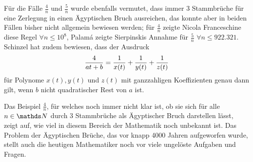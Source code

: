 Für die Fälle $\frac{4}{n}$ und $\frac{5}{n}$ wurde ebenfalls vermutet, dass immer 3 Stammbrüche für eine Zerlegung in einen Ägyptischen Bruch ausreichen, das konnte aber in beiden Fällen bisher nicht allgemein bewiesen werden; für $\frac{4}{n}$ zeigte Nicola Franceschine diese Regel $\forall n \leq 10^8$, Palamá zeigte Sierpinskis Annahme für $\frac{5}{n}$ $\forall n \leq 922.321$. Schinzel hat zudem bewiesen, dass der Ausdruck
$$\frac{4}{at+b} = \frac{1}{x(t)} + \frac{1}{y(t)} + \frac{1}{z(t)}$$
für Polynome $x(t), y(t)$ und $z(t)$ mit ganzzahligen Koeffizienten genau dann gilt, wenn $b$ nicht quadratischer Rest von $a$ ist. \cite[S. 88]{Guy1981}

Das Beispiel $\frac{4}{n}$, für welches noch immer nicht klar ist, ob sie sich für alle $n \in \N$ durch 3 Stammbrüche als Ägyptischer Bruch darstellen lässt, zeigt auf, wie viel in diesem Bereich der Mathematik noch unbekannt ist. Das Problem der Ägyptischen Brüche, das vor knapp 4000 Jahren aufgeworfen wurde, stellt auch die heutigen Mathematiker noch vor viele ungelöste Aufgaben und Fragen.